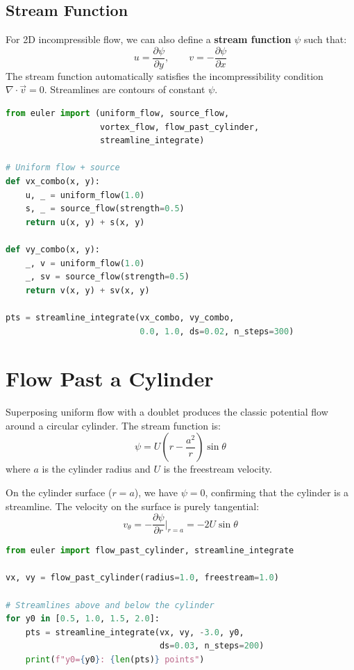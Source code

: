 \subsection{Stream Function}

For 2D incompressible flow, we can also define a \textbf{stream function} $\psi$ such that:
\[
u = \frac{\partial \psi}{\partial y}, \qquad v = -\frac{\partial \psi}{\partial x}
\]
The stream function automatically satisfies the incompressibility condition $\nabla \cdot \vec{v} = 0$.
Streamlines are contours of constant $\psi$.

\begin{lstlisting}[language=Python, caption=Superposing flow patterns]
from euler import (uniform_flow, source_flow,
                   vortex_flow, flow_past_cylinder,
                   streamline_integrate)

# Uniform flow + source
def vx_combo(x, y):
    u, _ = uniform_flow(1.0)
    s, _ = source_flow(strength=0.5)
    return u(x, y) + s(x, y)

def vy_combo(x, y):
    _, v = uniform_flow(1.0)
    _, sv = source_flow(strength=0.5)
    return v(x, y) + sv(x, y)

pts = streamline_integrate(vx_combo, vy_combo,
                           0.0, 1.0, ds=0.02, n_steps=300)
\end{lstlisting}

\section{Flow Past a Cylinder}

Superposing uniform flow with a doublet produces the classic potential flow around a circular cylinder. The stream function is:
\[
\psi = U \left(r - \frac{a^2}{r}\right) \sin\theta
\]
where $a$ is the cylinder radius and $U$ is the freestream velocity.

On the cylinder surface ($r = a$), we have $\psi = 0$, confirming that the cylinder is a streamline.
The velocity on the surface is purely tangential:
\[
v_\theta = -\frac{\partial \psi}{\partial r}\bigg|_{r=a} = -2U\sin\theta
\]

\begin{lstlisting}[language=Python, caption=Flow past a cylinder]
from euler import flow_past_cylinder, streamline_integrate

vx, vy = flow_past_cylinder(radius=1.0, freestream=1.0)

# Streamlines above and below the cylinder
for y0 in [0.5, 1.0, 1.5, 2.0]:
    pts = streamline_integrate(vx, vy, -3.0, y0,
                               ds=0.03, n_steps=200)
    print(f"y0={y0}: {len(pts)} points")
\end{lstlisting}

